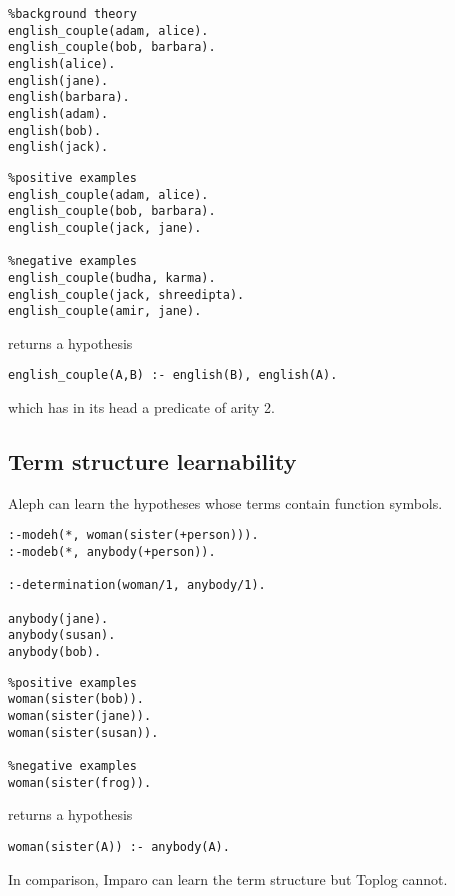 \begin{minipage}[t]{.50\textwidth}
\begin{lstlisting}
%background theory
english_couple(adam, alice).
english_couple(bob, barbara).
english(alice).
english(jane).
english(barbara).
english(adam).
english(bob).
english(jack).
\end{lstlisting}
\end{minipage}
\begin{minipage}[t]{.20\textwidth}
\begin{lstlisting}
%positive examples
english_couple(adam, alice).
english_couple(bob, barbara).
english_couple(jack, jane).

%negative examples
english_couple(budha, karma).
english_couple(jack, shreedipta).
english_couple(amir, jane).
\end{lstlisting}
\end{minipage}

returns a hypothesis

\begin{lstlisting}
english_couple(A,B) :- english(B), english(A).
\end{lstlisting} which has in its head a predicate of arity 2.

\subsection{Term structure learnability}
Aleph can learn the hypotheses whose terms contain function symbols.

\begin{minipage}[t]{.50\textwidth}
\begin{lstlisting}
:-modeh(*, woman(sister(+person))).
:-modeb(*, anybody(+person)).

:-determination(woman/1, anybody/1).

anybody(jane).
anybody(susan).
anybody(bob).
\end{lstlisting}
\end{minipage}
\begin{minipage}[t]{.20\textwidth}
\begin{lstlisting}
%positive examples
woman(sister(bob)).
woman(sister(jane)).
woman(sister(susan)).

%negative examples
woman(sister(frog)).
\end{lstlisting}
\end{minipage}

returns a hypothesis
\begin{lstlisting}
woman(sister(A)) :- anybody(A).
\end{lstlisting}
In comparison, Imparo can learn the term structure but Toplog cannot.


